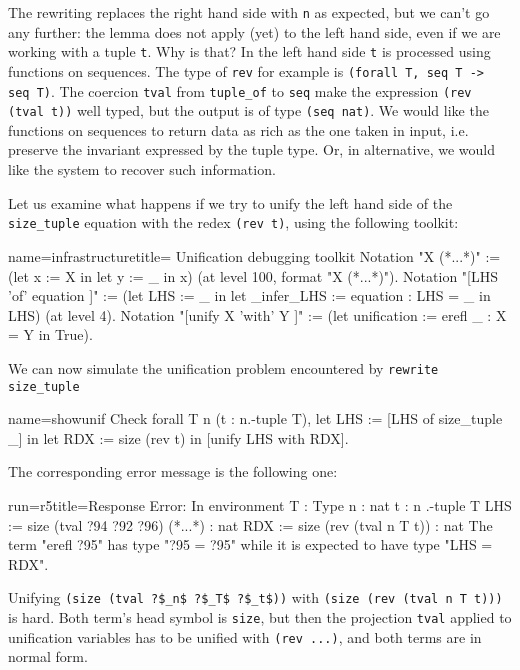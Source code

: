 The rewriting replaces the right hand side with \lstinline/n/ as
expected, but we can't go any further: the lemma does not
apply (yet) to the left hand side, even if we are working
with a tuple \lstinline/t/.  Why is that?  In the left hand side
\lstinline/t/ is processed using functions on sequences.
The type of \lstinline/rev/ for example is
\lstinline/(forall T, seq T -> seq T)/.  The coercion \lstinline/tval/
from \lstinline/tuple_of/ to \lstinline/seq/ make the
expression \lstinline/(rev (tval t))/ well typed, but the output
is of type \lstinline/(seq nat)/.
We would like the functions on sequences to return
data as rich as the one taken in input, i.e. preserve the invariant
expressed by the tuple type.  Or, in alternative, we would like the
system to recover such information.

Let us examine what happens if we try to unify the left hand side of the
\lstinline/size_tuple/ equation with the redex
\lstinline/(rev t)/, using the following toolkit:

\begin{coq}{name=infrastructure}{title= Unification debugging toolkit}
Notation "X (*...*)" :=
  (let x := X in let y := _ in x)   (at level 100, format "X  (*...*)").
Notation "[LHS 'of' equation ]" :=
  (let LHS := _ in
   let _infer_LHS := equation : LHS = _ in LHS)   (at level 4).
Notation "[unify X 'with' Y ]" :=
  (let unification := erefl _ : X = Y in True).
\end{coq}

We can now simulate the unification problem
encountered by \lstinline/rewrite size_tuple/

\begin{coq}{name=showunif}{}
Check forall T n (t : n.-tuple T),
 let LHS := [LHS of size_tuple _] in
 let RDX := size (rev t) in
 [unify LHS with RDX].
\end{coq}

The corresponding error message is the following one:

\begin{coqout}{run=r5}{title=Response}
Error:
In environment
T : Type
n : nat
t : n .-tuple T
LHS := size (tval ?94 ?92 ?96) (*...*) : nat
RDX := size (rev (tval n T t))           : nat
The term "erefl ?95" has type "?95 = ?95" while
it is expected to have type "LHS = RDX".
\end{coqout}

Unifying \lstinline/(size (tval ?$_n$ ?$_T$ ?$_t$))/
with \lstinline/(size (rev (tval n T t)))/ is hard.
Both term's head symbol is \lstinline/size/, but then
the projection \lstinline/tval/ applied to unification
variables has to be unified with \lstinline/(rev ...)/,
and both terms are in normal form.

